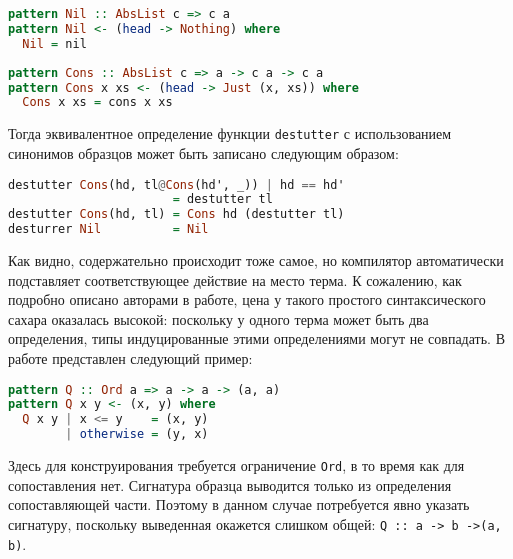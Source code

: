 \noindent
\begin{minipage}{\linewidth}
\begin{lstlisting}[language=haskell]
pattern Nil :: AbsList c => c a
pattern Nil <- (head -> Nothing) where
  Nil = nil
\end{lstlisting}
\end{minipage}

\noindent
\begin{minipage}{\linewidth}
\begin{lstlisting}[language=haskell]
pattern Cons :: AbsList c => a -> c a -> c a
pattern Cons x xs <- (head -> Just (x, xs)) where
  Cons x xs = cons x xs
\end{lstlisting}
\end{minipage}

Тогда эквивалентное определение функции \lstinline|destutter| с использованием синонимов образцов может быть записано следующим образом:

\noindent
\begin{minipage}{\linewidth}
\begin{lstlisting}[language=haskell]
destutter Cons(hd, tl@Cons(hd', _)) | hd == hd' 
                       = destutter tl
destutter Cons(hd, tl) = Cons hd (destutter tl)
desturrer Nil          = Nil
\end{lstlisting}
\end{minipage}

Как видно, содержательно происходит тоже самое, но компилятор автоматически подставляет соответствующее действие на место терма. К сожалению, как подробно описано авторами в работе, цена у такого простого синтаксического сахара оказалась высокой: поскольку у одного терма может быть два определения, типы индуцированные этими определениями могут не совпадать. В работе представлен следующий пример:

\noindent
\begin{minipage}{\linewidth}
\begin{lstlisting}[language=haskell]
pattern Q :: Ord a => a -> a -> (a, a)
pattern Q x y <- (x, y) where
  Q x y | x <= y    = (x, y)
        | otherwise = (y, x)
\end{lstlisting}
\end{minipage}

Здесь для конструирования требуется ограничение \lstinline|Ord|, в то время как для сопоставления нет. Сигнатура образца выводится только из определения сопоставляющей части. Поэтому в данном случае потребуется явно указать сигнатуру, поскольку выведенная окажется слишком общей: \lstinline|Q :: a -> b ->(a, b)|.

